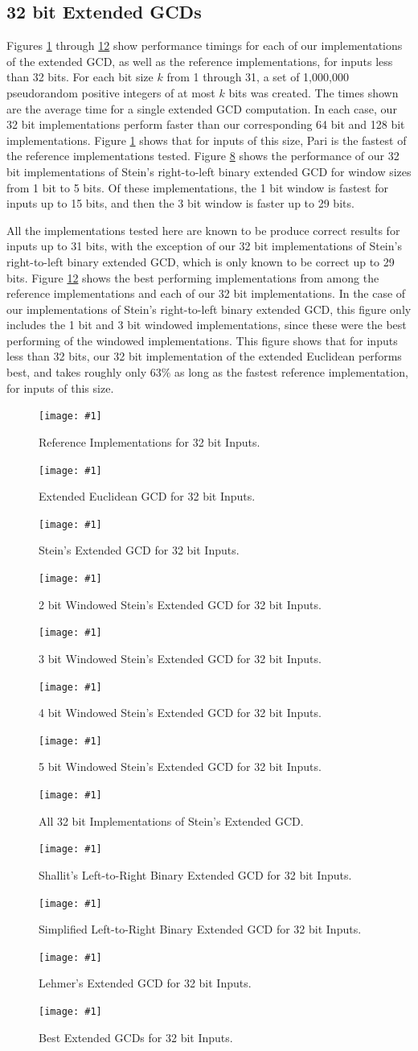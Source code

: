 \documentclass{ucalgthes1}
\theoremstyle{definition}
\newcommand{\mygraph}[3]{
	\begin{figure}[htb]
	\centering
	\texttt{[image: \#1]}
	\caption{#3}
	\label{#2}
	\end{figure}
}
\begin{document}
\subsection{32 bit Extended GCDs}

Figures \ref{fig:gcdRef32} through \ref{fig:gcdBest32} show performance timings for each of our implementations of the extended GCD, as well as the reference implementations, for inputs less than 32 bits. For each bit size $k$ from 1 through 31, a set of 1,000,000 pseudorandom positive integers of at most $k$ bits was created.  The times shown are the average time for a single extended GCD computation.  In each case, our 32 bit implementations perform faster than our corresponding 64 bit and 128 bit implementations.  Figure \ref{fig:gcdRef32} shows that for inputs of this size, Pari is the fastest of the reference implementations tested.  Figure \ref{fig:gcdSteins32} shows the performance of our 32 bit implementations of Stein's right-to-left binary extended GCD for window sizes from 1 bit to 5 bits.  Of these implementations, the 1 bit window is fastest for inputs up to 15 bits, and then the 3 bit window is faster up to 29 bits.  


All the implementations tested here are known to be produce correct results for inputs up to 31 bits, with the exception of our 32 bit implementations of Stein's right-to-left binary extended GCD, which is only known to be correct up to 29 bits.  Figure \ref{fig:gcdBest32} shows the best performing implementations from among the reference implementations and each of our 32 bit implementations.  In the case of our implementations of Stein's right-to-left binary extended GCD, this figure only includes the 1 bit and 3 bit windowed implementations, since these were the best performing of the windowed implementations.  This figure shows that for inputs less than 32 bits, our 32 bit implementation of the extended Euclidean performs best, and takes roughly only 63\% as long as the fastest reference implementation, for inputs of this size.

\mygraph{reference-impl-32}{fig:gcdRef32}{Reference Implementations for 32 bit Inputs.}
\mygraph{divrem-32}{fig:gcdDivrem32}{Extended Euclidean GCD for 32 bit Inputs.}
\mygraph{stein1-32}{fig:gcdStein1-32}{Stein's Extended GCD for 32 bit Inputs.}
\mygraph{stein2-32}{fig:gcdStein2-32}{2 bit Windowed Stein's Extended GCD for 32 bit Inputs.}
\mygraph{stein3-32}{fig:gcdStein3-32}{3 bit Windowed Stein's Extended GCD for 32 bit Inputs.}
\mygraph{stein4-32}{fig:gcdStein4-32}{4 bit Windowed Stein's Extended GCD for 32 bit Inputs.}
\mygraph{stein5-32}{fig:gcdStein5-32}{5 bit Windowed Stein's Extended GCD for 32 bit Inputs.}
\mygraph{steins-32}{fig:gcdSteins32}{All 32 bit Implementations of Stein's Extended GCD.}
\mygraph{shallit-32}{fig:gcdShallit32}{Shallit's Left-to-Right Binary Extended GCD for 32 bit Inputs.}
\mygraph{binary_l2r-32}{fig:gcdL2R32}{Simplified Left-to-Right Binary Extended GCD for 32 bit Inputs.}
\mygraph{lehmer-32}{fig:gcdLehmer32}{Lehmer's Extended GCD for 32 bit Inputs.}
\mygraph{best-32}{fig:gcdBest32}{Best Extended GCDs for 32 bit Inputs.}
\end{document}
